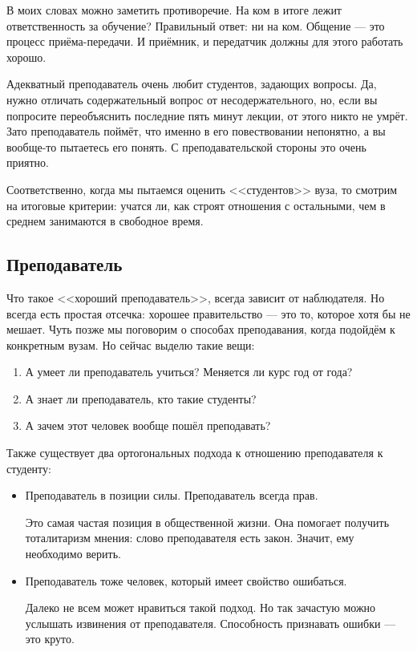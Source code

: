 \documentclass[12pt, a4paper]{article}
\begin{document}
В моих словах можно заметить противоречие. На ком в итоге лежит ответственность за обучение? Правильный ответ: ни на ком. Общение --- это процесс приёма-передачи. И приёмник, и передатчик должны для этого работать хорошо.

Адекватный преподаватель очень любит студентов, задающих вопросы. Да, нужно отличать содержательный вопрос от несодержательного, но, если вы попросите переобъяснить последние пять минут лекции, от этого никто не умрёт. Зато преподаватель поймёт, что именно в его повествовании непонятно, а вы вообще-то пытаетесь его понять. С преподавательской стороны это очень приятно. 

Соответственно, когда мы пытаемся оценить <<студентов>> вуза, то смотрим на итоговые критерии: учатся ли, как строят отношения с остальными, чем в среднем занимаются в свободное время.

\subsection{Преподаватель}

Что такое <<хороший преподаватель>>, всегда зависит от наблюдателя. Но всегда есть простая отсечка: хорошее правительство --- это то, которое хотя бы не мешает. Чуть позже мы поговорим о способах преподавания, когда подойдём к конкретным вузам. Но сейчас выделю такие вещи:
\begin{enumerate}
    \item А умеет ли преподаватель учиться? Меняется ли курс год от года? 
    \item А знает ли преподаватель, кто такие студенты?
    \item А зачем этот человек вообще пошёл преподавать?
\end{enumerate}

Также существует два ортогональных подхода к отношению преподавателя к студенту:
\begin{itemize}
    \item Преподаватель в позиции силы. Преподаватель всегда прав.
    
    Это самая частая позиция в общественной жизни. Она помогает получить тоталитаризм мнения: слово преподавателя есть закон. Значит, ему необходимо верить.
    \item Преподаватель тоже человек, который имеет свойство ошибаться.
    
    Далеко не всем может нравиться такой подход. Но так зачастую можно услышать извинения от преподавателя. Способность признавать ошибки --- это круто.
\end{itemize}
\end{document}
